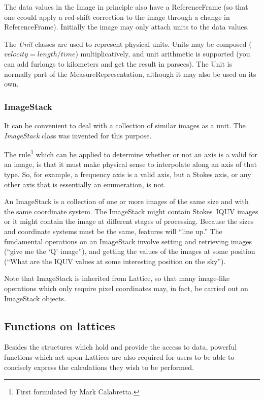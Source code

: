 The data values in the Image in principle also have a ReferenceFrame
(so that one ccould apply a red-shift correction to the image through
a change in ReferenceFrame). Initially the image may only attach units
to the data values.

The {\em Unit} classes are used to represent physical units. Units may
be composed ($velocity = length / time$) multiplicatively, and unit
arithmetic is supported (you can add furlongs to kilometers and get
the result in parsecs). The Unit is normally part of the
MeasureRepresentation, although it may also be used on its own.

\subsubsection{ImageStack}

It can be convenient to deal with a collection of similar images as a
unit. The {\em ImageStack} class was invented for this purpose.

The rule\footnote{First formulated by Mark Calabretta.} which can be
applied to determine whether or not an axis is a valid for an image,
is that it must make physical sense to interpolate along an axis of
that type. So, for example, a frequency axis is a valid axis, but a
Stokes axis, or any other axis that is essentially an enumeration, is
not.

An ImageStack is a collection of one or more images of the same size
and with the same coordinate system. The ImageStack might contain
Stokes~IQUV images or it might contain the image at different stages
of processing. Because the sizes and coordinate systems must be the
same, features will ``line up.''  The fundamental operations on an
ImageStack involve setting and retrieving images (``give me the `Q'
image''), and getting the values of the images at some position (``What
are the IQUV values at some interesting position on the sky'').

Note that ImageStack is inherited from Lattice, so that many
image-like operations which only require pixel coordinates may, in
fact, be carried out on ImageStack objects.


\subsection{Functions on lattices}

Besides the structures which hold and provide the access to data,
powerful functions which act upon Lattices are also required for users
to be able to concisely express the calculations they wish to be
performed.

